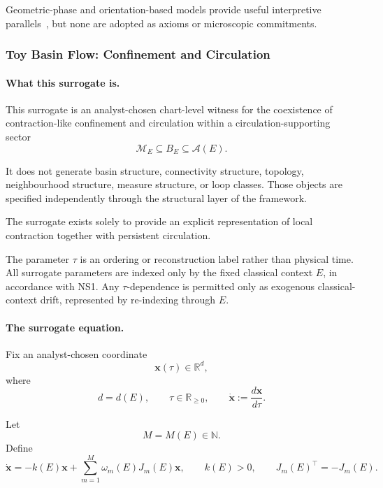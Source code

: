 \documentclass[aps,prx,onecolumn,11pt]{revtex4-2}
\theoremstyle{plain}
\theoremstyle{definition}
\theoremstyle{remark}
\begin{document}
Geometric-phase and orientation-based models provide useful
interpretive parallels~\cite{BarutZanghi1984,Hestenes1990,Berry1984},
but none are adopted as axioms or microscopic commitments.

\subsubsection{Toy Basin Flow: Confinement and Circulation}
\label{toy:spin_proxy:basin_flow}

\paragraph{What this surrogate is.}

This surrogate is an analyst-chosen chart-level witness for the
coexistence of contraction-like confinement and circulation within a
circulation-supporting sector
\[
\mathcal M_E
\subseteq
B_E
\subseteq
\mathcal A(E).
\]

It does not generate basin structure, connectivity structure, topology,
neighbourhood structure, measure structure, or loop classes. Those
objects are specified independently through the structural layer of the
framework.

The surrogate exists solely to provide an explicit representation of
local contraction together with persistent circulation.

The parameter \(\tau\) is an ordering or reconstruction label rather
than physical time. All surrogate parameters are indexed only by the
fixed classical context \(E\), in accordance with NS1. Any
\(\tau\)-dependence is permitted only as exogenous classical-context
drift, represented by re-indexing through \(E\).

\paragraph{The surrogate equation.}

Fix an analyst-chosen coordinate
\[
\mathbf{x}(\tau)\in\mathbb R^d,
\]
where
\[
d=d(E),
\qquad
\tau\in\mathbb R_{\geq 0},
\qquad
\dot{\mathbf{x}}
:=
\frac{d\mathbf{x}}{d\tau}.
\]

Let
\[
M=M(E)\in\mathbb N.
\]
Define
\begin{equation}
\dot{\mathbf{x}}
=
-k(E)\mathbf{x}
+
\sum_{m=1}^{M}
\omega_m(E)J_m(E)\mathbf{x},
\qquad
k(E)>0,
\qquad
J_m(E)^\top=-J_m(E).
\label{eq:toy_basin_flow_multifactor}
\end{equation}
\end{document}
